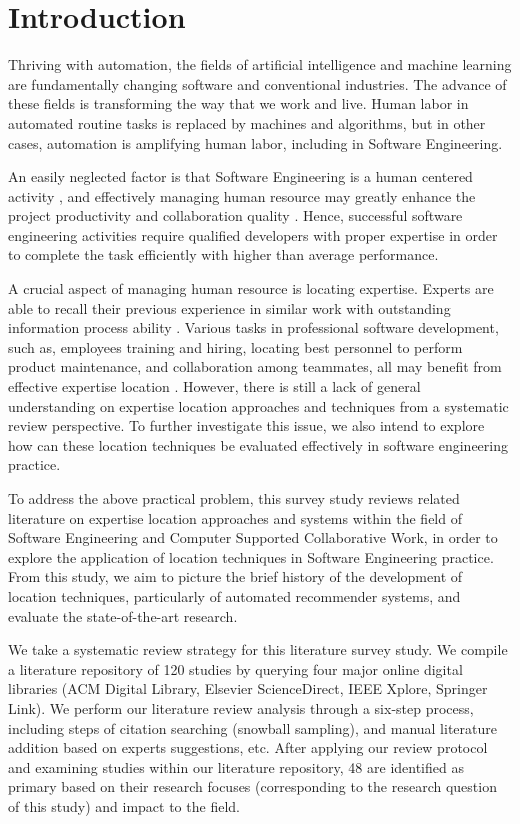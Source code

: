 \chapter{Introduction}

Thriving with automation, the fields of artificial intelligence and machine learning are fundamentally changing software and conventional industries. The advance of these fields is transforming the way that we work and live. Human labor in automated routine tasks is replaced by machines and algorithms, but in other cases, automation is amplifying human labor, including in Software Engineering.

An easily neglected factor is that Software Engineering is a human centered activity \cite{fischer2003desert}, and effectively managing human resource may greatly enhance the project productivity and collaboration quality \cite{brooks1995mythical}. Hence, successful software engineering activities require qualified developers with proper expertise in order to complete the task efficiently with higher than average performance. 

A crucial aspect of managing human resource is locating expertise. Experts are able to recall their previous experience in similar work \cite{bilalić2017neuroscience,ericsson2006cambridge} with outstanding information process ability \cite{Simon:1996:SA:237774}. Various tasks in professional software development, such as, employees training and hiring, locating best personnel to perform product maintenance, and collaboration among teammates, all may benefit from effective expertise location \citep{bergersen2014construction}. However, there is still a lack of general understanding on expertise location approaches and techniques from a systematic review perspective. To further investigate this issue, we also intend to explore how can these location techniques be evaluated effectively in software engineering practice.

To address the above practical problem, this survey study reviews related literature on expertise location approaches and systems within the field of Software Engineering and Computer Supported Collaborative Work, in order to explore the application of location techniques in Software Engineering practice. From this study, we aim to picture the brief history of the development of location techniques, particularly of automated recommender systems, and evaluate the state-of-the-art research.

We take a systematic review strategy for this literature survey study. We compile a literature repository of 120 studies by querying four major online digital libraries (ACM Digital Library, Elsevier ScienceDirect, IEEE Xplore, Springer Link). We perform our literature review analysis through a six-step process, including steps of citation searching (snowball sampling), and manual literature addition based on experts suggestions, etc. After applying our review protocol and examining studies within our literature repository, 48 are identified as primary based on their research focuses (corresponding to the research question of this study) and impact to the field.

